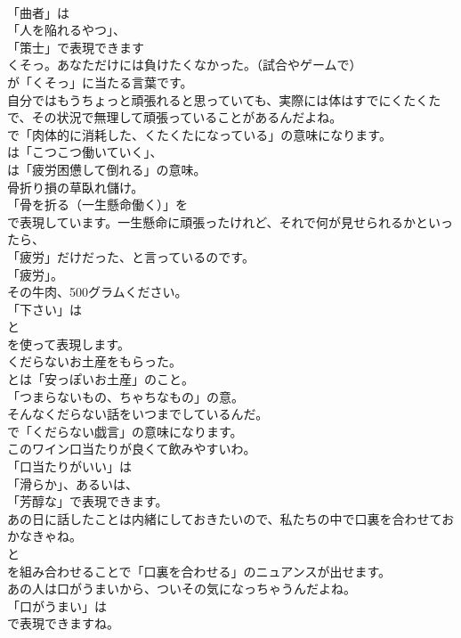 \documentclass[8pt]{extreport}
\begin{document}
\begin{CJK}{UTF8}{min}
\\	「曲者」は
\\	「人を陥れるやつ」、
\\	「策士」で表現できます	
\\	くそっ。あなただけには負けたくなかった。（試合やゲームで） 
\\	が「くそっ」に当たる言葉です。	
\\	自分ではもうちょっと頑張れると思っていても、実際には体はすでにくたくたで、その状況で無理して頑張っていることがあるんだよね。 
\\	で「肉体的に消耗した、くたくたになっている」の意味になります。
\\	は「こつこつ働いていく」、
\\	は「疲労困憊して倒れる」の意味。	
\\	骨折り損の草臥れ儲け。 
\\	「骨を折る（一生懸命働く）」を
\\	で表現しています。一生懸命に頑張ったけれど、それで何が見せられるかといったら、
\\	「疲労」だけだった、と言っているのです。
\\	「疲労」。	
\\	その牛肉、500グラムください。 
\\	「下さい」は
\\	と
\\	を使って表現します。	
\\	くだらないお土産をもらった。 
\\	とは「安っぽいお土産」のこと。
\\	「つまらないもの、ちゃちなもの」の意。	
\\	そんなくだらない話をいつまでしているんだ。 
\\	で「くだらない戯言」の意味になります。	
\\	このワイン口当たりが良くて飲みやすいわ。 
\\	「口当たりがいい」は
\\	「滑らか」、あるいは、
\\	「芳醇な」で表現できます。	
\\	あの日に話したことは内緒にしておきたいので、私たちの中で口裏を合わせておかなきゃね。 
\\	と
\\	を組み合わせることで「口裏を合わせる」のニュアンスが出せます。	
\\	あの人は口がうまいから、ついその気になっちゃうんだよね。 
\\	「口がうまい」は
\\	で表現できますね。	

\end{CJK}
\end{document}

